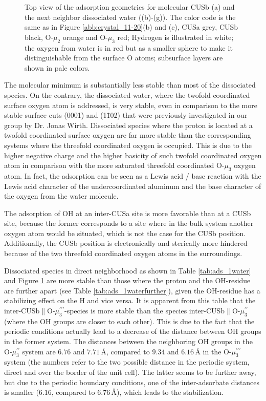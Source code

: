 \documentclass[11pt,DIV=13,BCOR=5mm,a4paper,headinclude]{scrbook}
\begin{document}
\begin{figure}[!ht]
 \caption{Top view of the adsorption geometries for molecular CUSb (a) and the next neighbor dissociated water 
((b)-(g)).
The color code is the same as in Figure \ref{abb:crystal_11-20}(b) and (c), CUSa grey, CUSb black, O-$\mu_2$ orange and O-$\mu_3$ red; Hydrogen is illustrated in white; the oxygen from water is in red but as a smaller sphere to make it distinguishable from the surface O atoms; subsurface layers are shown in pale colors.}
        \label{abb:ads-geoms}
 \end{figure}

The molecular minimum is substantially less stable than most of the dissociated species.
On the contrary, the dissociated water, where the twofold coordinated surface oxygen atom is addressed, is very stable, even in comparison to the more stable surface cuts (0001) and (1\=102) that were previously investigated in our group by Dr. Jonas Wirth\cite{Wirth2016,WirthJPCC2012}.
Dissociated species where the proton is located at a twofold coordinated surface oxygen are far more stable than the corresponding systems where the threefold coordinated oxygen is occupied.
This is due to the higher negative charge and the higher basicity of such twofold coordinated oxygen atom in comparison with the more saturated threefold coordinated O-$\mu_3$ oxygen atom.
In fact, the adsorption can be seen as a Lewis acid / base reaction\cite{Stair1981} with the Lewis acid character of the undercoordinated aluminum and the base character of the oxygen from the water molecule.


The adsorption of OH at an inter-CUSa site is more favorable than at a CUSb site, because the former corresponds to a site where in the bulk system another oxygen atom would be situated, which is not the case for the CUSb position.
Additionally, the CUSb position is electronically and sterically more hindered because of the two threefold coordinated oxygen atoms in the surroundings.


Dissociated species in direct neighborhood as shown in Table \ref{tab:ads_1water} and Figure \ref{abb:ads-geoms} are more stable than those where the proton and the OH-residue are further apart (see Table \ref{tab:ads_1waterfurther}), given the OH-residue has a stabilizing effect on the H and vice versa.
It is apparent from this table that the inter-CUSb$\parallel$O-$\mu_3^{\prime\prime\prime}$-species is more stable than the species inter-CUSb$\parallel$O-$\mu_3^{\prime\prime}$ (where the OH groups are closer to each other).
This is due to the fact that the periodic conditions actually lead to a decrease of the distance between OH groups in the former system.
The distances between the neighboring OH groups in the O-$\mu_3^{\prime\prime}$ system are $6.76$ and $7.71\,$\AA{}, compared to $9.34$ and $6.16\,$\AA{} in the O-$\mu_3^{\prime\prime\prime}$ system (the numbers refer to the two possible distance in the periodic system, direct and over the border of the unit cell).
The latter seems to be further away, but due to the periodic boundary conditions, one of the inter-adsorbate distances is smaller ($6.16$, compared to $6.76\,$\AA{}), which leads to the stabilization.
\end{document}
